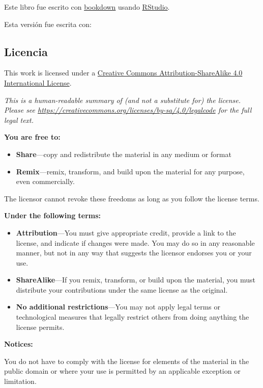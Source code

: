 \documentclass[
  a4paper,
  oneside,
  openany]{book}
\begin{document}
Este libro fue escrito con \href{http://bookdown.org/}{bookdown} usando \href{http://www.rstudio.com/ide/}{RStudio}.

Esta versión fue escrita con:

\hypertarget{licencia}{%
\subsection*{Licencia}\label{licencia}}


This work is licensed under a \href{https://creativecommons.org/licenses/by-sa/4.0/}{Creative Commons Attribution-ShareAlike 4.0 International License}.

\emph{This is a human-readable summary of (and not a substitute for) the license.
Please see \url{https://creativecommons.org/licenses/by-sa/4.0/legalcode} for the full legal text.}

\textbf{You are free to:}

\begin{itemize}
\item
  \textbf{Share}---copy and redistribute the material in any medium or
  format
\item
  \textbf{Remix}---remix, transform, and build upon the material for any
  purpose, even commercially.
\end{itemize}

The licensor cannot revoke these freedoms as long as you follow the
license terms.

\textbf{Under the following terms:}

\begin{itemize}
\item
  \textbf{Attribution}---You must give appropriate credit, provide a link
  to the license, and indicate if changes were made. You may do so in
  any reasonable manner, but not in any way that suggests the licensor
  endorses you or your use.
\item
  \textbf{ShareAlike}---If you remix, transform, or build upon the material, you must distribute your contributions under the same license as the original.
\item
  \textbf{No additional restrictions}---You may not apply legal terms or
  technological measures that legally restrict others from doing
  anything the license permits.
\end{itemize}

\textbf{Notices:}

You do not have to comply with the license for elements of the
material in the public domain or where your use is permitted by an
applicable exception or limitation.
\end{document}
